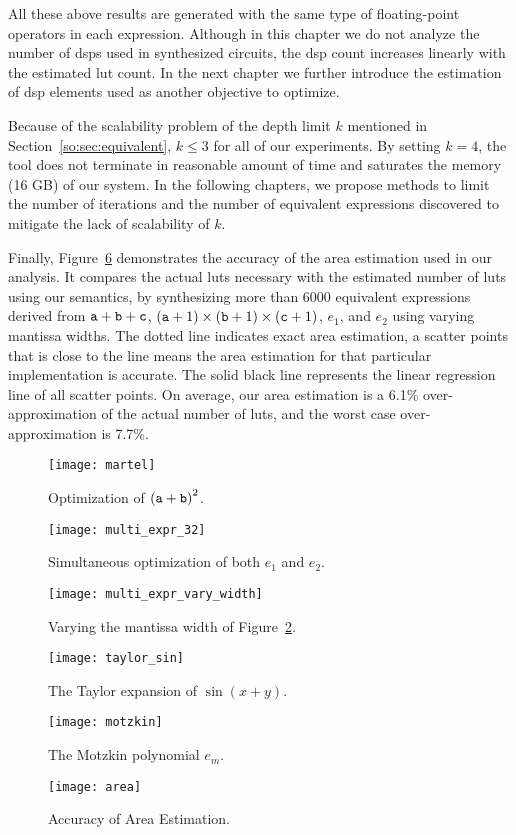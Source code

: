 All these above results are generated with the same type of floating-point
operators in each expression.  Although in this chapter we do not analyze
the number of \glspl{dsp} used in synthesized circuits, the \gls{dsp} count
increases linearly with the estimated \gls{lut} count.  In the next chapter
we further introduce the estimation of \gls{dsp} elements used as another
objective to optimize.

Because of the scalability problem of the depth limit $k$ mentioned in
Section~\ref{so:sec:equivalent}, $k \leq 3$ for all of our experiments.  By
setting $k = 4$, the tool does not terminate in reasonable amount of time and
saturates the memory (16 GB) of our system.  In the following chapters, we
propose methods to limit the number of iterations and the number of equivalent
expressions discovered to mitigate the lack of scalability of $k$.

Finally, Figure~\ref{so:fig:area} demonstrates the accuracy of the area
estimation used in our analysis. It compares the actual \glspl{lut} necessary
with the estimated number of \glspl{lut} using our semantics, by synthesizing
more than 6000 equivalent expressions derived from $\texttt{a} + \texttt{b} + \texttt{c}$,
$(\texttt{a} + 1) \times (\texttt{b} + 1) \times (\texttt{c} + 1)$, $e_1$, and $e_2$ using
varying mantissa widths. The dotted line indicates exact area estimation, a
scatter points that is close to the line means the area estimation for that
particular implementation is accurate. The solid black line represents the
linear regression line of all scatter points. On average, our area estimation
is a 6.1\% over-approximation of the actual number of \glspl{lut}, and the
worst case over-approximation is 7.7\%.
\newcommand{\figsize}{0.5}
\begin{figure}[ht]
    \centering
    \texttt{[image: martel]}
    \caption{Optimization of ${(\texttt{a} + \texttt{b})}^2$.}\label{so:fig:martel}
\end{figure}
\begin{figure}[ht]
    \centering
    \texttt{[image: multi\_expr\_32]}
    \caption{%
        Simultaneous optimization of both $e_1$ and $e_2$.
    }\label{so:fig:multi_expr_32}
\end{figure}
\begin{figure}[ht]
    \centering
    \texttt{[image: multi\_expr\_vary\_width]}
    \caption{%
        Varying the mantissa width of Figure~\ref{so:fig:multi_expr_32}.
    }\label{so:fig:multi_expr_vary_width}
\end{figure}
\begin{figure}[ht]
    \centering
    \texttt{[image: taylor\_sin]}
    \caption{The Taylor expansion of $\sin(x + y)$.}\label{so:fig:taylor_sin}
\end{figure}
\begin{figure}[ht]
    \centering
    \texttt{[image: motzkin]}
    \caption{The Motzkin polynomial $e_m$.}\label{so:fig:motzkin}
\end{figure}
\begin{figure}[ht]
    \centering
    \texttt{[image: area]}
    \caption{Accuracy of Area Estimation.}\label{so:fig:area}
\end{figure}
